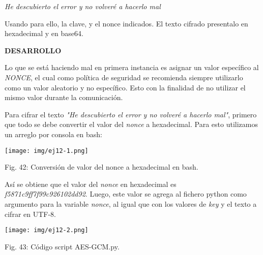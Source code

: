 \documentclass[12pt,oneside,a4paper]{book}
\begin{document}
\textit{He descubierto el error y no volveré a hacerlo mal}

\vspace{1em}

Usando para ello, la clave, y el nonce indicados. El texto cifrado presentalo en hexadecimal y en base64.

\vspace{2em}

\hspace{20pt} \textbf{DESARROLLO}

\vspace{1em}

\hspace{20pt}
Lo que se está haciendo mal en primera instancia es asignar un valor específico al \textit{NONCE}, el cual como política de seguridad se recomienda siempre utilizarlo como un valor aleatorio y no específico. Esto con la finalidad de no utilizar el mismo valor durante la comunicación.

\vspace{1em}

\hspace{20pt}
Para cifrar el texto \textit{"He descubierto el error y no volveré a hacerlo mal"}, primero que todo se debe convertir el valor del \textit{nonce} a hexadecimal. Para esto utilizamos un arreglo por consola en bash:

\vspace{2em}

\begin{center}
    \texttt{[image: img/ej12-1.png]}
    
\vspace{0.1em}
    
    Fig. 42: Conversión de valor del nonce a hexadecimal en bash.
\end{center}

\vspace{2em}

Así se obtiene que el valor del \textit{nonce} en hexadecimal es \textit{f5871c9ff7f99c926102dd92}. Luego, este valor se agrega al fichero python como argumento para la variable \textit{nonce}, al igual que con los valores de \textit{key} y el texto a cifrar en UTF-8.

\vspace{2em}

\begin{center}
    \texttt{[image: img/ej12-2.png]}
    
\vspace{0.1em}
    
    Fig. 43: Código script AES-GCM.py.
\end{center}
\end{document}
